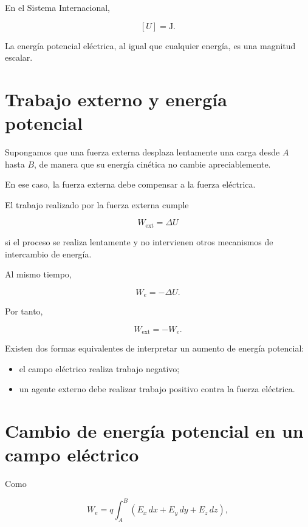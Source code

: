 En el Sistema Internacional,

\[
\boxed{[U]=\si{\joule}}.
\]

La energía potencial eléctrica, al igual que cualquier energía, es una magnitud
escalar.


\section{Trabajo externo y energía potencial}

Supongamos que una fuerza externa desplaza lentamente una carga desde \(A\) hasta
\(B\), de manera que su energía cinética no cambie apreciablemente.

En ese caso, la fuerza externa debe compensar a la fuerza eléctrica.

El trabajo realizado por la fuerza externa cumple

\begin{equation}
\boxed{
W_{\text{ext}}=\Delta U
}
\label{eq:trabajo_externo_deltaU}
\end{equation}

si el proceso se realiza lentamente y no intervienen otros mecanismos de intercambio
de energía.

Al mismo tiempo,

\[
W_e=-\Delta U.
\]

Por tanto,

\[
\boxed{
W_{\text{ext}}=-W_e
}.
\]

\begin{idea}

Existen dos formas equivalentes de interpretar un aumento de energía potencial:

\begin{itemize}
    \item el campo eléctrico realiza trabajo negativo;
    \item un agente externo debe realizar trabajo positivo contra la fuerza eléctrica.
\end{itemize}

\end{idea}


\section{Cambio de energía potencial en un campo eléctrico}

Como

\[
W_e
=
q\int_A^B
\left(
E_x\,dx+E_y\,dy+E_z\,dz
\right),
\]

